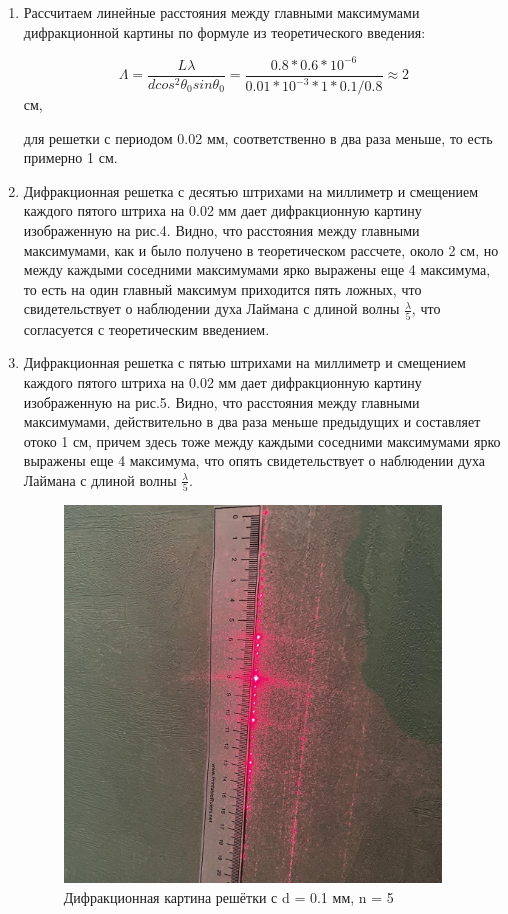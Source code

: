 \documentclass[a4paper,12pt]{article}
\begin{document}
\begin{enumerate}
\item Рассчитаем линейные расстояния между главными максимумами дифракционной картины по формуле из теоретического введения:

\[ \Lambda = \frac{L\lambda}{d cos^2 \theta_0sin\theta_0} = \frac{0.8 * 0.6 * 10^{-6}}{0.01 * 10^{-3} * 1 * 0.1/0.8} \approx 2\]см,

для решетки с периодом 0.02 мм, соответственно в два раза меньше, то есть примерно 1 см.


\item Дифракционная решетка с десятью штрихами на миллиметр и смещением каждого пятого штриха на 0.02 мм дает дифракционную картину изображенную на рис.4. Видно, что расстояния между главными максимумами, как и было получено в теоретическом рассчете, около 2 см, но между каждыми соседними максимумами ярко выражены еще 4 максимума, то есть на один главный максимум приходится пять ложных, что свидетельствует о наблюдении духа Лаймана с длиной волны $\frac{\lambda}{5}$, что согласуется с теоретическим введением.


\item Дифракционная решетка с пятью штрихами на миллиметр и смещением каждого пятого штриха на 0.02 мм дает дифракционную картину изображенную на рис.5. Видно, что расстояния между главными максимумами, действительно в два раза меньше предыдущих и составляет отоко 1 см, причем здесь тоже между каждыми соседними максимумами ярко выражены еще 4 максимума, что опять свидетельствует о наблюдении духа Лаймана с длиной волны $\frac{\lambda}{5}$.

  \begin{figure}[H]
  \begin{center}
    \includegraphics[width=10cm]{ex3.jpg}
    \caption{Дифракционная картина решётки с d = 0.1 мм, n = 5}
    \label{fig:}
  \end{center}
\end{figure}



\end{enumerate}
\end{document}
